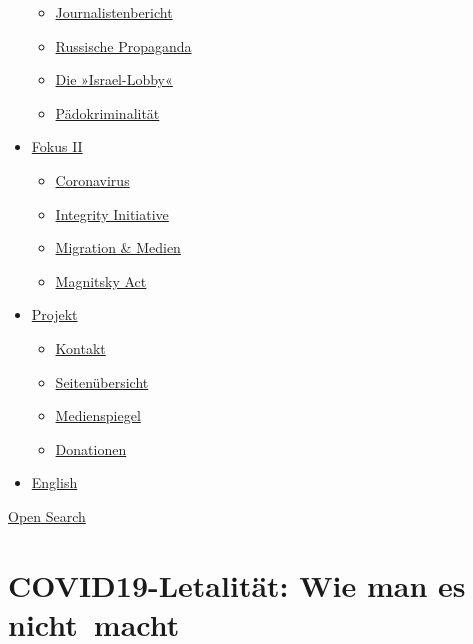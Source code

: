 \begin{itemize}
  \begin{itemize}
  \tightlist
  \item
    \href{https://swprs.org/bericht-eines-journalisten/}{Journalistenbericht}
  \item
    \href{https://swprs.org/russische-propaganda/}{Russische Propaganda}
  \item
    \href{https://swprs.org/die-israel-lobby-fakten-und-mythen/}{Die
    »Israel-Lobby«}
  \item
    \href{https://swprs.org/geopolitik-und-paedokriminalitaet/}{Pädokriminalität}
  \end{itemize}
\item
  \href{https://swprs.org/migration-und-medien/}{Fokus II}

  \begin{itemize}
  \tightlist
  \item
    \href{https://swprs.org/covid-19-hinweis-ii/}{Coronavirus}
  \item
    \href{https://swprs.org/die-integrity-initiative/}{Integrity
    Initiative}
  \item
    \href{https://swprs.org/migration-und-medien/}{Migration \& Medien}
  \item
    \href{https://swprs.org/der-fall-magnitsky/}{Magnitsky Act}
  \end{itemize}
\item
  \href{https://swprs.org/kontakt/}{Projekt}

  \begin{itemize}
  \tightlist
  \item
    \href{https://swprs.org/kontakt/}{Kontakt}
  \item
    \href{https://swprs.org/uebersicht/}{Seitenübersicht}
  \item
    \href{https://swprs.org/medienspiegel/}{Medienspiegel}
  \item
    \href{https://swprs.org/donationen/}{Donationen}
  \end{itemize}
\item
  \href{https://swprs.org/contact/}{English}
\end{itemize}

\protect\hyperlink{}{Open Search}

\hypertarget{covid19-letalituxe4t-wie-man-es-nicht-macht}{%
\section{COVID19-Letalität: Wie man es
nicht~macht}\label{covid19-letalituxe4t-wie-man-es-nicht-macht}}

